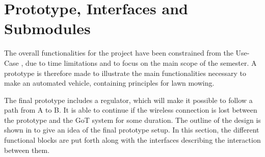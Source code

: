 \section{Prototype, Interfaces and Submodules} \label{Finalprototype}





The overall functionalities for the project have been constrained from the Use-Case , due to time limitations and to focus on the main scope of the semester. A prototype is therefore made to illustrate the main functionalities necessary to make an automated vehicle, containing principles for lawn mowing.

The final prototype includes a regulator, which will make it possible to follow a path from A to B. It is able to continue if the wireless connection is lost between the prototype and the GoT system for some duration. The outline of the design is shown in  to give an idea of the final prototype setup. In this section, the different functional blocks are put forth along with the interfaces describing the interaction between them.

